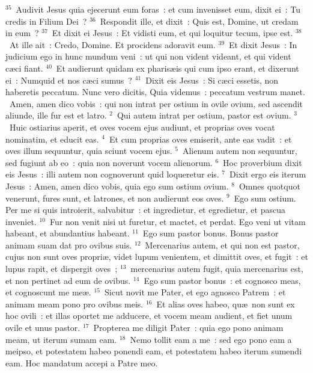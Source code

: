 ${}^{35}$~Audivit Jesus quia ejecerunt eum foras~: et cum invenisset eum, dixit ei~: Tu credis in Filium Dei~?
${}^{36}$~Respondit ille, et dixit~: Quis est, Domine, ut credam in eum~?
${}^{37}$~Et dixit ei Jesus~: Et vidisti eum, et qui loquitur tecum, ipse est.
${}^{38}$~At ille ait~: Credo, Domine. Et procidens adoravit eum.
${}^{39}$~Et dixit Jesus~: In judicium ego in hunc mundum veni~: ut qui non vident videant, et qui vident c\ae ci fiant.
${}^{40}$~Et audierunt quidam ex pharis\ae is qui cum ipso erant, et dixerunt ei~: Numquid et nos c\ae ci sumus~?
${}^{41}$~Dixit eis Jesus~: Si c\ae ci essetis, non haberetis peccatum. Nunc vero dicitis, Quia videmus~: peccatum vestrum manet.
~\lettrine[lines=10,image=true,loversize=0.05,lraise=-0.03]{A}{}men, amen dico vobis~: qui non intrat per ostium in ovile ovium, sed ascendit aliunde, ille fur est et latro.
${}^{2}$~Qui autem intrat per ostium, pastor est ovium.
${}^{3}$~Huic ostiarius aperit, et oves vocem ejus audiunt, et proprias oves vocat nominatim, et educit eas.
${}^{4}$~Et cum proprias oves emiserit, ante eas vadit~: et oves illum sequuntur, quia sciunt vocem ejus.
${}^{5}$~Alienum autem non sequuntur, sed fugiunt ab eo~: quia non noverunt vocem alienorum.
${}^{6}$~Hoc proverbium dixit eis Jesus~: illi autem non cognoverunt quid loqueretur eis.
${}^{7}$~Dixit ergo eis iterum Jesus~: Amen, amen dico vobis, quia ego sum ostium ovium.
${}^{8}$~Omnes quotquot venerunt, fures sunt, et latrones, et non audierunt eos oves.
${}^{9}$~Ego sum ostium. Per me si quis introierit, salvabitur~: et ingredietur, et egredietur, et pascua inveniet.
${}^{10}$~Fur non venit nisi ut furetur, et mactet, et perdat. Ego veni ut vitam habeant, et abundantius habeant.
${}^{11}$~Ego sum pastor bonus. Bonus pastor animam suam dat pro ovibus suis.
${}^{12}$~Mercenarius autem, et qui non est pastor, cujus non sunt oves propri\ae , videt lupum venientem, et dimittit oves, et fugit~: et lupus rapit, et dispergit oves~;
${}^{13}$~mercenarius autem fugit, quia mercenarius est, et non pertinet ad eum de ovibus.
${}^{14}$~Ego sum pastor bonus~: et cognosco meas, et cognoscunt me me\ae .
${}^{15}$~Sicut novit me Pater, et ego agnosco Patrem~: et animam meam pono pro ovibus meis.
${}^{16}$~Et alias oves habeo, qu\ae\ non sunt ex hoc ovili~: et illas oportet me adducere, et vocem meam audient, et fiet unum ovile et unus pastor.
${}^{17}$~Propterea me diligit Pater~: quia ego pono animam meam, ut iterum sumam eam.
${}^{18}$~Nemo tollit eam a me~: sed ego pono eam a meipso, et potestatem habeo ponendi eam, et potestatem habeo iterum sumendi eam. Hoc mandatum accepi a Patre meo.


